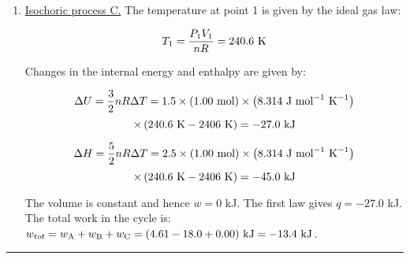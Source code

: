 \begin{enumerate}
\item \underline{Isochoric process C.} The temperature at point 1 is given by the ideal gas law:

$$T_1 = \frac{P_1V_1}{nR} = 240.6\textnormal{ K}$$

Changes in the internal energy and enthalpy are given by:

$$\Delta U = \frac{3}{2}nR\Delta T = 1.5\times \left(1.00\textnormal{ mol}\right) \times \left( 8.314\textnormal{ J mol}^{-1}\textnormal{ K}^{-1}\right)$$
$$\times\left(240.6\textnormal{ K} - 2406\textnormal{ K}\right) = -27.0\textnormal{ kJ}$$

$$\Delta H = \frac{5}{2}nR\Delta T = 2.5\times \left(1.00\textnormal{ mol}\right) \times \left( 8.314\textnormal{ J mol}^{-1}\textnormal{ K}^{-1}\right)$$
$$\times\left(240.6\textnormal{ K} - 2406\textnormal{ K}\right) = -45.0\textnormal{ kJ}$$

The volume is constant and hence $w = 0$ kJ. The first law gives $q = -27.0$ kJ. The total work in the cycle is: $w_{tot} = w_{\textnormal{A}} + w_{\textnormal{B}} + w_{\textnormal{C}} = (4.61 - 18.0 + 0.00)\textnormal{ kJ} = -13.4\textnormal{ kJ}$.

\end{enumerate}

\hrule\vspace{0.5cm}
